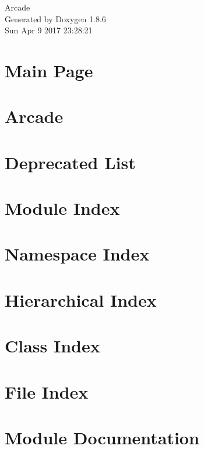 \documentclass[twoside]{book}
\newcommand{\clearemptydoublepage}{%
  \newpage{\pagestyle{empty}\cleardoublepage}%
}
\begin{document}
\hypersetup{pageanchor=false}
\begin{titlepage}
\vspace*{7cm}
\begin{center}%
{\Large Arcade }\\
\vspace*{1cm}
{\large Generated by Doxygen 1.8.6}\\
\vspace*{0.5cm}
{\small Sun Apr 9 2017 23:28:21}\\
\end{center}
\end{titlepage}
\clearemptydoublepage
\tableofcontents
\clearemptydoublepage
{}
\hypersetup{pageanchor=true}

\chapter{Main Page}
\label{index}\hypertarget{index}{}
\chapter{Arcade}
\label{md__r_e_a_d_m_e}
\hypertarget{md__r_e_a_d_m_e}{}

\chapter{Deprecated List}
\label{deprecated}
\hypertarget{deprecated}{}

\chapter{Module Index}

\chapter{Namespace Index}

\chapter{Hierarchical Index}

\chapter{Class Index}

\chapter{File Index}

\chapter{Module Documentation}





\end{document}
